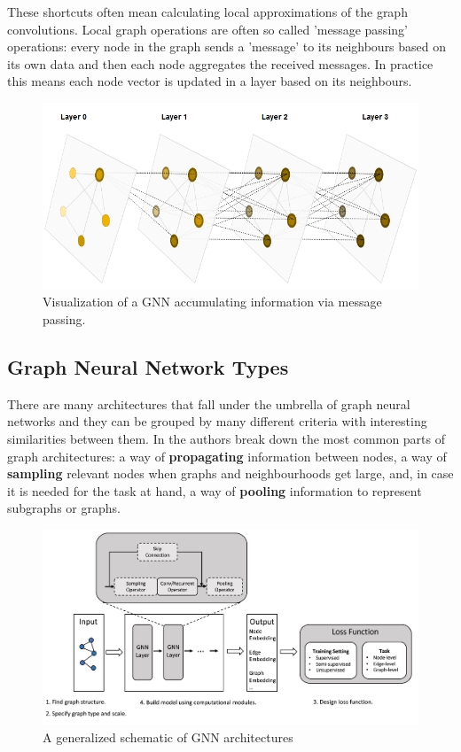 	These shortcuts often mean calculating local approximations of the graph convolutions. Local graph operations are often so called 'message passing' operations: every node in the graph sends a 'message' to its neighbours based on its own data and then each node aggregates the received messages. In practice this means each node vector is updated in a layer based on its neighbours.
	
	\begin{figure}[!h]
		\centering
		\includegraphics[width=\textwidth]{figures/gnn.png}
		\caption{Visualization of a GNN accumulating information via message passing. \cite{sanchez-lengeling2021a}}
	\end{figure}
		
	\subsection{Graph Neural Network Types}
	
	There are many architectures that fall under the umbrella of graph neural networks and they can be grouped by many different criteria with interesting similarities between them. In \cite{gnn_review} the authors break down the most common parts of graph architectures: a way of \textbf{propagating} information between nodes, a way of \textbf{sampling} relevant nodes when graphs and neighbourhoods get large, and, in case it is needed for the task at hand, a way of \textbf{pooling} information to represent subgraphs or graphs.
	
	 \begin{figure}[!h]
	 	\centering
	 	\includegraphics[width=\textwidth]{figures/gnn_general_structure.jpg}
	 	\caption{A generalized schematic of GNN architectures \cite{gnn_review}}
	 \end{figure}
	 
